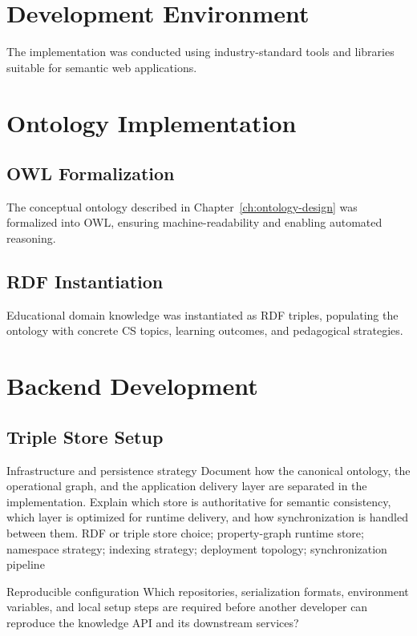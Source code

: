 \section{Development Environment}

The implementation was conducted using industry-standard tools and libraries suitable for semantic web applications.

\section{Ontology Implementation}

\subsection{OWL Formalization}

The conceptual ontology described in Chapter~\ref{ch:ontology-design} was formalized into OWL, ensuring machine-readability and enabling automated reasoning.

\subsection{RDF Instantiation}

Educational domain knowledge was instantiated as RDF triples, populating the ontology with concrete CS topics, learning outcomes, and pedagogical strategies.

\section{Backend Development}

\subsection{Triple Store Setup}

\CategoryPrompt
  {Infrastructure and persistence strategy}
  {Document how the canonical ontology, the operational graph, and the application delivery layer are separated in the implementation. Explain which store is authoritative for semantic consistency, which layer is optimized for runtime delivery, and how synchronization is handled between them.}
  {RDF or triple store choice; property-graph runtime store; namespace strategy; indexing strategy; deployment topology; synchronization pipeline}

\OpenQuestionPrompt
  {Reproducible configuration}
  {Which repositories, serialization formats, environment variables, and local setup steps are required before another developer can reproduce the knowledge API and its downstream services?}

